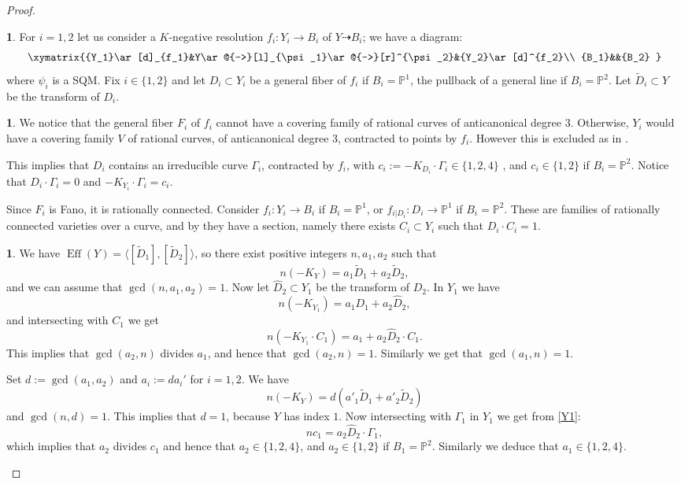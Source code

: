\documentclass[a4paper,12pt]{amsart}
\theoremstyle{definition}
\newtheorem{prg}[thm]{}
\numberwithin{figure}{section}
\numberwithin{table}{section}
\newcommand{\w}{\widetilde}
\newcommand{\pr}{\mathbb{P}}
\newcommand{\Eff}{\operatorname{Eff}}
\begin{document}
\begin{proof}
\begin{prg}
For $i=1,2$ let us consider a $K$-negative resolution 
 $f_i\colon Y_i\to B_i$ of $Y\dasharrow B_i$;
we have a diagram:
$$\xymatrix{{Y_1}\ar[d]_{f_1}&Y\ar@{-->}[l]_{\psi_1}\ar@{-->}[r]^{\psi_2}&{Y_2}\ar[d]^{f_2}\\
{B_1}&&{B_2}
}$$
where $\psi_i$ is a SQM.
Fix $i\in\{1,2\}$ and let $D_i\subset Y_i$ be a general fiber of $f_i$ if $B_i=\pr^1$, the pullback of a general line if $B_i=\pr^2$.
Let $\w{D}_i\subset Y$ be the transform of $D_i$.
\end{prg}
  \begin{prg}
    We notice that
    the general fiber $F_i$ of $f_i$ cannot have a covering family of rational curves of anticanonical degree $3$.
    Otherwise, $Y_i$ would have a covering family $V$ of rational curves, of anticanonical degree $3$, contracted to points by $f_i$. However this is excluded as in \cite[4.24]{blowup}.

    This implies that $D_i$ contains an irreducible curve $\Gamma_i$, contracted by $f_i$,  with $c_i:=-K_{D_i}\cdot \Gamma_i\in\{1,2,4\}$ \cite[Cor.~IV.1.15]{kollar}, and $c_i\in\{1,2\}$ if $B_i=\pr^2$.  Notice that $D_i\cdot\Gamma_i=0$ and $-K_{Y_i}\cdot\Gamma_i=c_i$.

    Since $F_i$ is Fano, it is rationally connected.
Consider $f_i\colon Y_i\to B_i$ if $B_i=\pr^1$, or
$f_{i|D_i}\colon D_i\to\pr^1$ 
 if $B_i=\pr^2$. These are families of rationally connected varieties over a curve, and 
by \cite{GraberHarrisStarr} they have a section, namely
there exists $C_i\subset Y_i$ such that  $D_i\cdot C_i=1$.
    \end{prg}
  \begin{prg}\label{colorado}
We have $\Eff(Y)=\langle[\w{D}_1],[\w{D}_2]\rangle$, so there exist positive integers $n,a_1,a_2$ such that
$$n(-K_Y)=a_1\w{D}_1+a_2\w{D}_2,$$
and we can assume that $\gcd(n,a_1,a_2)=1$. 
Now let $\widehat{D}_2\subset Y_1$ be the transform of $D_2$. In $Y_1$ we have 
\begin{equation}\label{Y1}
n(-K_{Y_1})=a_1D_1+a_2\widehat{D}_2,
\end{equation}
 and intersecting with $C_1$ we get 
$$n(-K_{Y_1}\cdot C_1)=a_1+a_2\widehat{D}_2\cdot C_1.$$
This implies that $\gcd(a_2,n)$ divides $a_1$, and hence that $\gcd(a_2,n)=1$. Similarly we get that $\gcd(a_1,n)=1$.

Set $d:=\gcd(a_1,a_2)$ and  $a_i:=da_i'$ for $i=1,2$. 
We have
$$n(-K_Y)=d(a'_1\w{D}_1+a'_2\w{D}_2)$$
and $\gcd(n,d)=1$. This implies that $d=1$, because $Y$ has index $1$. 
Now intersecting with $\Gamma_1$ in $Y_1$ we get from \eqref{Y1}:
$$nc_1=a_2\widehat{D}_2\cdot\Gamma_1,$$
which implies that $a_2$ divides $c_1$ and hence that $a_2\in\{1,2,4\}$, and $a_2\in\{1,2\}$ if $B_1=\pr^2$.
Similarly we deduce that $a_1\in\{1,2,4\}$.


\end{prg}
\end{proof}
\end{document}
